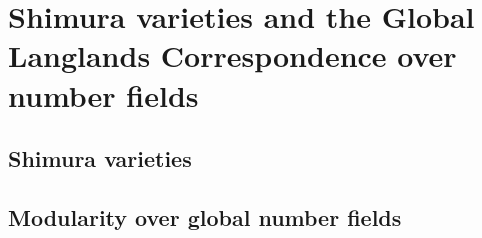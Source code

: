     \part{Shimura varieties and the Global Langlands Correspondence over number fields}
        \chapter{Shimura varieties}
            \begin{abstract}
                
            \end{abstract}
            
            \minitoc
            
            
            
            
            
            
            
        \chapter{Modularity over global number fields}
            \begin{abstract}
                
            \end{abstract}
            
            \minitoc
            
